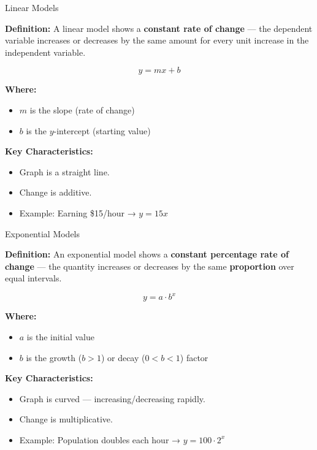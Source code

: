 \documentclass{beamer}
\begin{document}
\begin{frame}{Linear Models}
\small

\textbf{Definition:}  
A linear model shows a \textbf{constant rate of change} — the dependent variable increases or decreases by the same amount for every unit increase in the independent variable.

\[
y = mx + b
\]

\textbf{Where:}
\begin{itemize}
    \item $m$ is the slope (rate of change)
    \item $b$ is the $y$-intercept (starting value)
\end{itemize}

\textbf{Key Characteristics:}
\begin{itemize}
    \item Graph is a straight line.
    \item Change is additive.
    \item Example: Earning \$15/hour → $y = 15x$
\end{itemize}

\end{frame}


\begin{frame}{Exponential Models}
\small

\textbf{Definition:}  
An exponential model shows a \textbf{constant percentage rate of change} — the quantity increases or decreases by the same \textbf{proportion} over equal intervals.

\[
y = a \cdot b^x
\]

\textbf{Where:}
\begin{itemize}
    \item $a$ is the initial value
    \item $b$ is the growth ($b > 1$) or decay ($0 < b < 1$) factor
\end{itemize}

\textbf{Key Characteristics:}
\begin{itemize}
    \item Graph is curved — increasing/decreasing rapidly.
    \item Change is multiplicative.
    \item Example: Population doubles each hour → $y = 100 \cdot 2^x$
\end{itemize}
\end{frame}
\end{document}

